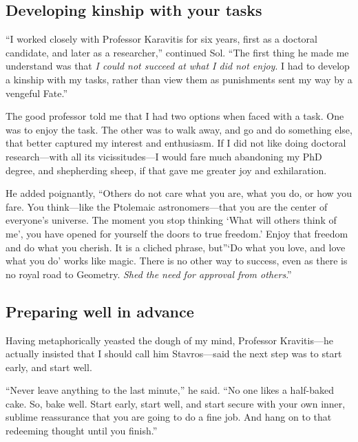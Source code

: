 \documentclass[
  a4paper,
]{article}
\begin{document}
\hypertarget{developing-kinship-with-your-tasks}{%
\subsection{Developing kinship with your
tasks}\label{developing-kinship-with-your-tasks}}

``I worked closely with Professor Karavitis for six years, first as a
doctoral candidate, and later as a researcher,'' continued Sol. ``The
first thing he made me understand was that \emph{I could not succeed at
what I did not enjoy}. I had to develop a kinship with my tasks, rather
than view them as punishments sent my way by a vengeful Fate.''

The good professor told me that I had two options when faced with a
task. One was to enjoy the task. The other was to walk away, and go and
do something else, that better captured my interest and enthusiasm. If I
did not like doing doctoral research---with all its vicissitudes---I
would fare much abandoning my PhD degree, and shepherding sheep, if that
gave me greater joy and exhilaration.

He added poignantly, ``Others do not care what you are, what you do, or
how you fare. You think---like the Ptolemaic astronomers---that you are
the center of everyone's universe. The moment you stop thinking `What
will others think of me', you have opened for yourself the doors to true
freedom.' Enjoy that freedom and do what you cherish. It is a cliched
phrase, but''`Do what you love, and love what you do' works like magic.
There is no other way to success, even as there is no royal road to
Geometry. \emph{Shed the need for approval from others}.''

\hypertarget{preparing-well-in-advance}{%
\subsection{Preparing well in advance}\label{preparing-well-in-advance}}

Having metaphorically yeasted the dough of my mind, Professor
Kravitis---he actually insisted that I should call him Stavros---said
the next step was to start early, and start well.

``Never leave anything to the last minute,'' he said. ``No one likes a
half-baked cake. So, bake well. Start early, start well, and start
secure with your own inner, sublime reassurance that you are going to do
a fine job. And hang on to that redeeming thought until you finish.''
\end{document}

